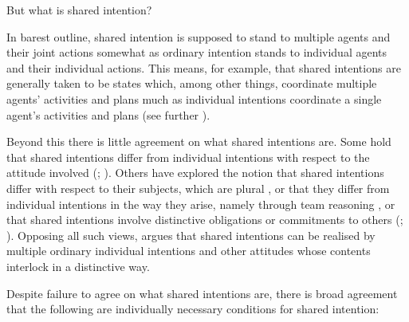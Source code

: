 \documentclass[12pt,a4paper]{extarticle}
\begin{document}
But what is shared intention?

In barest outline, shared intention is supposed to stand to multiple agents and their joint actions somewhat as ordinary intention stands to individual agents and their individual actions.  This means, for example, that shared intentions are generally taken to be states which, among other things, coordinate multiple agents' activities and plans much as individual intentions coordinate a single agent's activities and plans (see further \citealp{Bratman:1993je}).



Beyond this there is little agreement on what shared intentions are.
Some hold that shared intentions differ from individual intentions with respect to the attitude involved (\citealp{Kutz:2000si}; \citealp{Searle:1990em}). 
Others have explored the notion that shared intentions differ with respect to their subjects, which are plural \citep{Gilbert:1992rs}, 
or that they differ from individual intentions in the way they arise, namely through team reasoning \citep{Gold:2007zd}, 
or that shared intentions involve distinctive obligations or commitments to others (\citealp{Gilbert:1992rs}; \citealp{Roth:2004ki}).
Opposing all such views, \citet{Bratman:1992mi,Bratman:2009lv} argues that shared intentions can be realised by multiple ordinary individual intentions and other attitudes whose contents interlock in a distinctive way. 


Despite failure to agree on what shared intentions are, there is broad agreement that the following are individually necessary conditions for shared intention:
\end{document}
